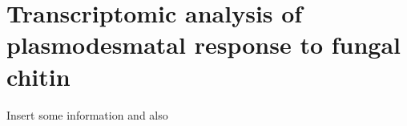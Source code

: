 \documentclass[../main.tex]{subfiles}
\begin{document}
\chapter{Transcriptomic analysis of plasmodesmatal response to fungal chitin}
\label{cha:transcripts}

Insert some information \cite{basselMulticellularSystemsBiology2019} and also \cite{hughesNonDestructiveHighContentAnalysis2017}
\end{document}
